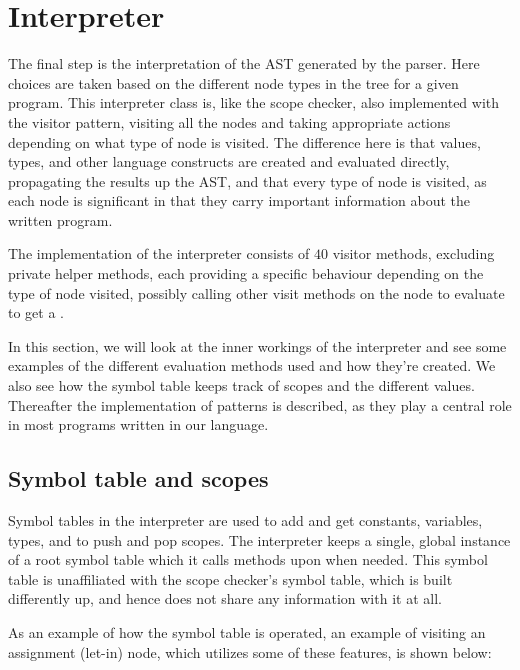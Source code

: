 \section{Interpreter}
\label{sec:interpreter}

The final step is the interpretation of the AST generated by the parser.
Here choices are taken based on the different node types in the tree
for a given program. This interpreter class is, like the scope checker,
also implemented with the visitor pattern, visiting all the nodes and
taking appropriate actions depending on what type of node is visited.
The difference here is that values, types, and other language constructs
are created and evaluated directly, propagating the results up the AST,
and that every type of node is visited, as each node is significant in
that they carry important information about the written program.

The implementation of the interpreter consists of $40$ visitor methods,
excluding private helper methods, each providing a specific behaviour
depending on the type of node visited, possibly calling other visit
methods on the node to evaluate to get a .

In this section, we will look at the inner workings of the interpreter
and see some examples of the different evaluation methods used and how
they're created. We also see how the symbol table keeps track of scopes
and the different values. Thereafter the implementation of patterns is
described, as they play a central role in most programs written in our
language.


\subsection{Symbol table and scopes}
Symbol tables in the interpreter are used to add and get constants,
variables, types, and to push and pop scopes. The interpreter keeps a
single, global instance of a root symbol table which it calls methods
upon when needed. This symbol table is unaffiliated with the scope
checker's symbol table, which is built differently up, and hence does
not share any information with it at all.

As an example of how the symbol table is operated, an example of
visiting an assignment (let-in) node, which utilizes some of these
features, is shown below:

